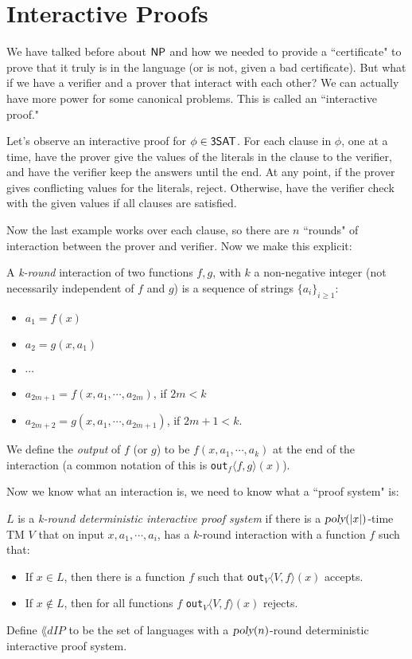 \section{Interactive Proofs}

We have talked before about ${\mathsf{NP}}$ and how we needed to provide a ``certificate" to prove that it truly is in the language (or is not, given a bad certificate). But what if we have a verifier and a prover that interact with each other? We can actually have more power for some canonical problems. This is called an ``interactive proof."

\begin{example}
Let's observe an interactive proof for $\phi \in {\ensuremath{\mathsf{3SAT}}}$. For each clause in $\phi$, one at a time, have the prover give the values of the literals in the clause to the verifier, and have the verifier keep the answers until the end. At any point, if the prover gives conflicting values for the literals, reject. Otherwise, have the verifier check with the given values if all clauses are satisfied.
\end{example}

Now the last example works over each clause, so there are $n$ ``rounds" of interaction between the prover and verifier. Now we make this explicit:

\newcommand{\out}[2]{\texttt{out}$_{#1}\langle {#1}, {#2} \rangle(x)$}
\begin{definition}
A \emph{k-round} interaction of two functions $f, g$, with $k$ a non-negative integer (not necessarily independent of $f$ and $g$) is a sequence of strings $\{a_i\}_{i \ge 1}$:
\begin{itemize}
\item $a_1 = f(x)$
\item $a_2 = g(x, a_1)$
\item $\cdots$
\item $a_{2m+1} = f(x, a_1, \cdots, a_{2m})$, if $2m < k$
\item $a_{2m+2} = g(x, a_1, \cdots, a_{2m+1})$, if $2m+1 < k$.
\end{itemize}
We define the \emph{output} of $f$ (or $g$) to be $f(x, a_1, \cdots, a_k)$ at the end of the interaction (a common notation of this is \out{f}{g}). 
\end{definition}

Now we know what an interaction is, we need to know what a ``proof system" is:

\newcommand{\dIP}{\lang{dIP}}
\begin{definition}
$L$ is a \emph{k-round deterministic interactive proof system} if there is a ${\textsl{poly}}(|x|)$-time TM $V$ that on input $x, a_1, \cdots, a_i$, has a $k$-round interaction with a function $f$ such that:
\begin{itemize}
\item If $x \in L$, then there is a function $f$ such that \out{V}{f} accepts.
\item If $x \notin L$, then for all functions $f$ \out{V}{f} rejects.
\end{itemize} 
Define $\dIP$ to be the set of languages with a ${\textsl{poly}}(n)$-round deterministic interactive proof system. 
\end{definition}

